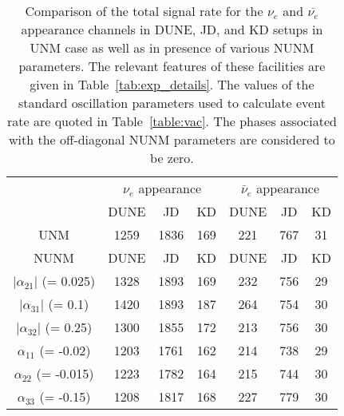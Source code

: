 \documentclass[11pt,a4paper]{article}
\newcommand{\capdef}{}
\newcommand{\mycaption}[2][\capdef]{\renewcommand{\capdef}{#2}
	\caption[#1]{{\footnotesize #2}}}
\begin{document}
\begin{table}

	\centering
	
	\begin{tabular}{|ccc|*{6}{c|}}
		
		\hline\hline
		
		\multicolumn{3}{|c|}{\multirow{2}{*}{}} & \multicolumn{3}{|c}{$\nu_e$ appearance} & \multicolumn{3}{|c|}{$\bar\nu_e$ appearance}\\ 
		
		\cline{4-9}
		
		\multicolumn{3}{|c|}{} & DUNE & JD & KD & DUNE & JD & KD \\
		
		\hline\hline
		
		\multicolumn{3}{|c|}{UNM} & 1259 & 1836 & 169 & 221 & 767 & 31 \\
		
		\cline{1-9}
		
		\hline\hline
		
		\multicolumn{3}{|c|}{NUNM} & DUNE & JD & KD & DUNE & JD & KD \\
		\hline\hline
		
		\multicolumn{3}{|c|}{$|\alpha_{21}|$ (= 0.025)} & 1328 & 1893 & 169 & 232 & 756 & 29 \\
		\hline
		\multicolumn{3}{|c|}{$|\alpha_{31}|$ (= 0.1)} & 1420 & 1893 & 187  & 264 & 754 & 30\\
		\hline
		\multicolumn{3}{|c|}{$|\alpha_{32}|$ (= 0.25)} & 1300 & 1855 & 172 & 213 & 756 & 30\\
		\hline
		\multicolumn{3}{|c|}{$\alpha_{11}$ (= -0.02)} & 1203 & 1761 & 162 & 214 & 738 & 29 \\
		\hline
		\multicolumn{3}{|c|}{$\alpha_{22}$  (= -0.015)} & 1223 & 1782 & 164 & 215 & 744 & 30 \\
		\hline
		\multicolumn{3}{|c|}{$\alpha_{33}$ (= -0.15)} & 1208 & 1817 & 168  & 227 & 779 & 30\\
		
		\hline
		\hline
		
	\end{tabular}
	
	\mycaption{Comparison of the total signal rate for the $\nu_{e}$ and $\bar{\nu_{e}}$ appearance channels in DUNE, JD, and KD setups in UNM case as well as in presence of various NUNM parameters. The relevant features of these facilities are given in Table~\ref{tab:exp_details}. The values of the standard oscillation parameters used to calculate event rate are quoted in Table~\ref{table:vac}. The phases associated with the off-diagonal NUNM parameters are considered
		to be zero.}
	
	\label{tab:total_events_app}
	
\end{table}
\end{document}
